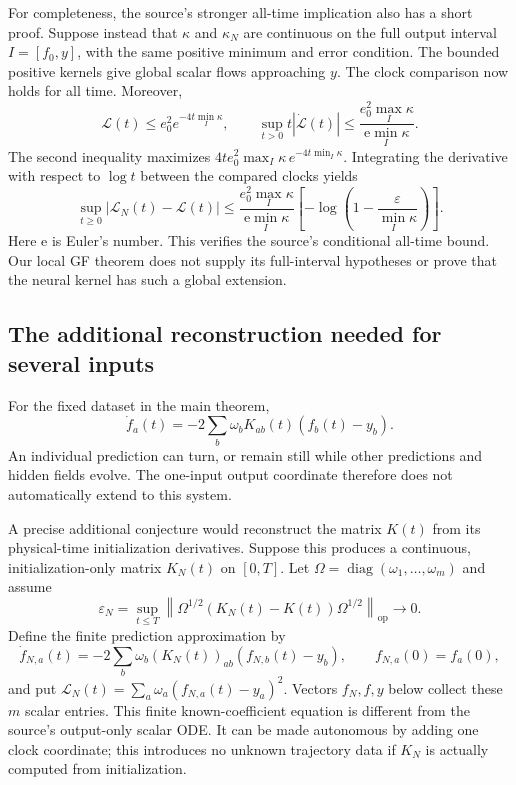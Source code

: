 For completeness, the source's stronger all-time implication also has a
short proof.  Suppose instead that $\kappa$ and $\kappa_N$ are continuous
on the full output interval $I=[f_0,y]$, with the same positive minimum and
error condition.  The bounded positive kernels give global scalar flows
approaching $y$.  The clock comparison now holds for all time.  Moreover,
\[
 \mathcal L(t)\le e_0^2e^{-4t\min_I\kappa},
 \qquad
 \sup_{t>0}t|\dot{\mathcal L}(t)|
 \le\frac{e_0^2\max_I\kappa}{\mathrm e\min_I\kappa}.
\]
The second inequality maximizes
$4t e_0^2\max_I\kappa\,e^{-4t\min_I\kappa}$.  Integrating the derivative
with respect to $\log t$ between the compared clocks yields
\[
 \sup_{t\ge0}|\mathcal L_N(t)-\mathcal L(t)|
 \le
 \frac{e_0^2\max_I\kappa}{\mathrm e\min_I\kappa}
 \left[-\log\!\left(1-\frac{\varepsilon}{\min_I\kappa}\right)\right].
\]
Here $\mathrm e$ is Euler's number.  This verifies the source's conditional
all-time bound.  Our local GF theorem does not supply its full-interval
hypotheses or prove that the neural kernel has such a global extension.

\subsection{The additional reconstruction needed for several inputs}
\label{app:borel-matrix-error}

For the fixed dataset in the main theorem,
\[
 \dot f_a(t)=-2\sum_b\omega_bK_{ab}(t)(f_b(t)-y_b).
\]
An individual prediction can turn, or remain still while other predictions
and hidden fields evolve.  The one-input output coordinate therefore does
not automatically extend to this system.

A precise additional conjecture would reconstruct the matrix $K(t)$ from
its physical-time initialization derivatives.  Suppose this produces a
continuous, initialization-only matrix $K_N(t)$ on $[0,T]$.  Let
$\Omega=\operatorname{diag}(\omega_1,\ldots,\omega_m)$ and assume
\[
 \varepsilon_N=
 \sup_{t\le T}
 \left\|\Omega^{1/2}(K_N(t)-K(t))\Omega^{1/2}\right\|_{\operatorname{op}}
 \longrightarrow0.
\]
Define the finite prediction approximation by
\[
 \dot f_{N,a}(t)=-2\sum_b\omega_b(K_N(t))_{ab}(f_{N,b}(t)-y_b),
 \qquad f_{N,a}(0)=f_a(0),
\]
and put $\mathcal L_N(t)=\sum_a\omega_a(f_{N,a}(t)-y_a)^2$.
Vectors $f_N,f,y$ below collect these $m$ scalar entries.  This finite
known-coefficient equation is different from the source's output-only
scalar ODE.  It can be made autonomous by adding one clock coordinate; this
introduces no unknown trajectory data if $K_N$ is actually computed from
initialization.

